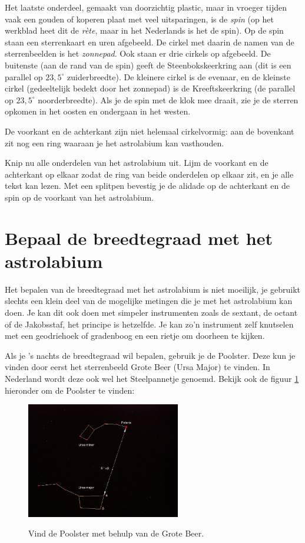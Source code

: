 Het laatste onderdeel, gemaakt van doorzichtig plastic, maar in vroeger tijden vaak een gouden of koperen plaat met veel uitsparingen, is de \textit{spin} (op het werkblad heet dit de \textit{r\`ete}, maar in het Nederlands is het de spin). Op de spin staan een sterrenkaart en uren afgebeeld. De cirkel met daarin de namen van de sterrenbeelden is het \textit{zonnepad}. Ook staan er drie cirkels op afgebeeld. De buitenste (aan de rand van de spin) geeft de Steenbokskeerkring aan (dit is een parallel op $23,5^{\circ}$ zuiderbreedte).  De kleinere cirkel is de evenaar, en de kleinste cirkel (gedeeltelijk bedekt door het zonnepad) is de Kreeftskeerkring (de parallel op $23,5^{\circ}$ noorderbreedte). Als je de spin met de klok mee draait, zie je de sterren opkomen in het oosten en ondergaan in het westen.

De voorkant en de achterkant zijn niet helemaal cirkelvormig: aan de bovenkant zit nog een ring waaraan je het astrolabium kan vasthouden.

\begin{opgave}[\schaar]
 Knip nu alle onderdelen van het astrolabium uit. Lijm de voorkant en de achterkant op elkaar zodat de ring van beide onderdelen op elkaar zit, en je alle tekst kan lezen. Met een splitpen bevestig je de alidade op de achterkant en de spin op de voorkant van het astrolabium.
\end{opgave}

\section{Bepaal de breedtegraad met het astrolabium}
Het bepalen van de breedtegraad met het astrolabium is niet moeilijk, je gebruikt slechts een klein deel van de mogelijke metingen die je met het astrolabium kan doen. Je kan dit ook doen met simpeler instrumenten zoals de sextant, de octant of de Jakobsstaf, het principe is hetzelfde. Je kan zo'n instrument zelf knutselen met een geodriehoek of gradenboog en een rietje om doorheen te kijken.

Als je 's nachts de breedtegraad wil bepalen, gebruik je de Poolster. Deze kun je vinden door eerst het sterrenbeeld Grote Beer (Ursa Major) te vinden. In Nederland wordt deze ook wel het Steelpannetje genoemd. Bekijk ook de figuur \ref{poolster} hieronder om de Poolster te vinden:
\begin{figure}[h]
\centering
 \includegraphics[width=0.6\textwidth]{Polaris.jpg}
 \label{poolster}
 \caption{Vind de Poolster met behulp van de Grote Beer.}
\end{figure}

